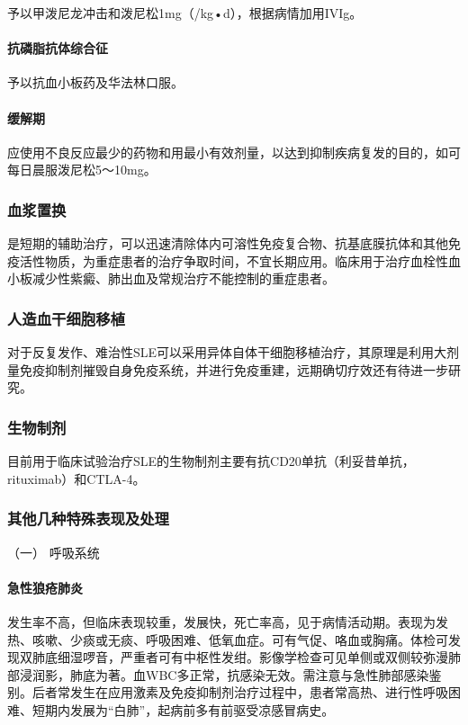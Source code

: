 予以甲泼尼龙冲击和泼尼松1mg（/kg•d），根据病情加用IVIg。

\paragraph{抗磷脂抗体综合征}

予以抗血小板药及华法林口服。

\paragraph{缓解期}

应使用不良反应最少的药物和用最小有效剂量，以达到抑制疾病复发的目的，如可每日晨服泼尼松5～10mg。

\subsubsection{血浆置换}

是短期的辅助治疗，可以迅速清除体内可溶性免疫复合物、抗基底膜抗体和其他免疫活性物质，为重症患者的治疗争取时间，不宜长期应用。临床用于治疗血栓性血小板减少性紫癜、肺出血及常规治疗不能控制的重症患者。

\subsubsection{人造血干细胞移植}

对于反复发作、难治性SLE可以采用异体自体干细胞移植治疗，其原理是利用大剂量免疫抑制剂摧毁自身免疫系统，并进行免疫重建，远期确切疗效还有待进一步研究。

\subsubsection{生物制剂}

目前用于临床试验治疗SLE的生物制剂主要有抗CD20单抗（利妥昔单抗，rituximab）和CTLA-4。

\subsubsection{其他几种特殊表现及处理}

\hypertarget{text00347.htmlux5cux23CHP14-1-3-9-1}{}
（一） 呼吸系统

\paragraph{急性狼疮肺炎}

发生率不高，但临床表现较重，发展快，死亡率高，见于病情活动期。表现为发热、咳嗽、少痰或无痰、呼吸困难、低氧血症。可有气促、咯血或胸痛。体检可发现双肺底细湿啰音，严重者可有中枢性发绀。影像学检查可见单侧或双侧较弥漫肺部浸润影，肺底为著。血WBC多正常，抗感染无效。需注意与急性肺部感染鉴别。后者常发生在应用激素及免疫抑制剂治疗过程中，患者常高热、进行性呼吸困难、短期内发展为“白肺”，起病前多有前驱受凉感冒病史。


